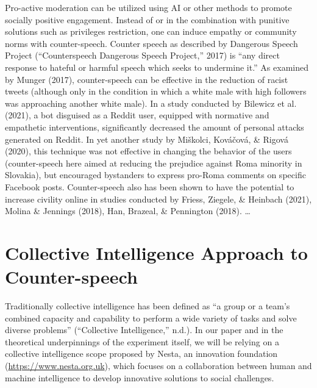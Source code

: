 \documentclass[
  10pt,
  dvipsnames,enabledeprecatedfontcommands]{scrartcl}
\begin{document}
Pro-active moderation can be utilized using AI or other methods to
promote socially positive engagement. Instead of or in the combination
with punitive solutions such as privileges restriction, one can induce
empathy or community norms with counter-speech. Counter speech as
described by Dangerous Speech Project ({``Counterspeech {{}} {Dangerous}
{Speech} {Project},''} 2017) is ``any direct response to hateful or
harmful speech which seeks to undermine it.'' As examined by Munger
(2017), counter-speech can be effective in the reduction of racist
tweets (although only in the condition in which a white male with high
followers was approaching another white male). In a study conducted by
Bilewicz et al. (2021), a bot disguised as a Reddit user, equipped with
normative and empathetic interventions, significantly decreased the
amount of personal attacks generated on Reddit. In yet another study by
Miškolci, Kováčová, \& Rigová (2020), this technique was not effective
in changing the behavior of the users (counter-speech here aimed at
reducing the prejudice against Roma minority in Slovakia), but
encouraged bystanders to express pro-Roma comments on specific Facebook
posts. Counter-speech also has been shown to have the potential to
increase civility online in studies conducted by Friess, Ziegele, \&
Heinbach (2021), Molina \& Jennings (2018), Han, Brazeal, \& Pennington
(2018). \ldots{}

\hypertarget{collective-intelligence-approach-to-counter-speech}{%
\section{Collective Intelligence Approach to
Counter-speech}\label{collective-intelligence-approach-to-counter-speech}}

Traditionally collective intelligence has been defined as ``a group or a
team's combined capacity and capability to perform a wide variety of
tasks and solve diverse problems'' ({``Collective {Intelligence},''}
n.d.). In our paper and in the theoretical underpinnings of the
experiment itself, we will be relying on a collective intelligence scope
proposed by Nesta, an innovation foundation
(\url{https://www.nesta.org.uk}), which focuses on a collaboration
between human and machine intelligence to develop innovative solutions
to social challenges.
\end{document}
